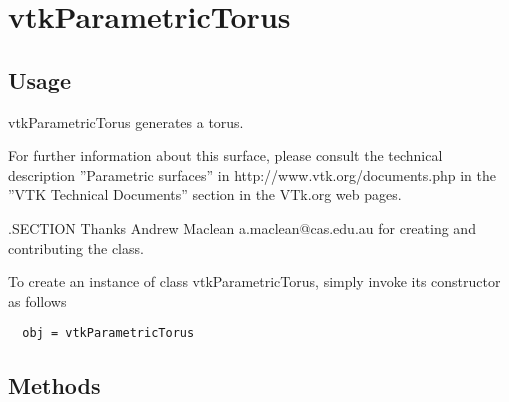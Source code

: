 \section{vtkParametricTorus}

\subsection{Usage}

 vtkParametricTorus generates a torus.

 For further information about this surface, please consult the 
 technical description ''Parametric surfaces'' in http://www.vtk.org/documents.php 
 in the ''VTK Technical Documents'' section in the VTk.org web pages.

 .SECTION Thanks
 Andrew Maclean a.maclean@cas.edu.au for 
 creating and contributing the class.


To create an instance of class vtkParametricTorus, simply
invoke its constructor as follows
\begin{verbatim}
  obj = vtkParametricTorus
\end{verbatim}
\subsection{Methods}


